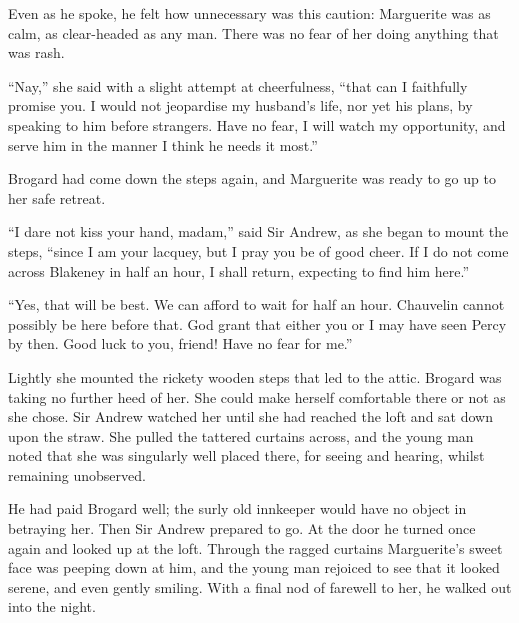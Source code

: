 Even as he spoke, he felt how unnecessary was this caution: Marguerite was as calm, as clear-headed as any man. There was no fear of her doing anything that was rash.

\enquote{Nay,} she said with a slight attempt at cheerfulness, \enquote{that can I faithfully promise you. I would not jeopardise my husband's life, nor yet his plans, by speaking to him before strangers. Have no fear, I will watch my opportunity, and serve him in the manner I think he needs it most.}

Brogard had come down the steps again, and Marguerite was ready to go up to her safe retreat.

\enquote{I dare not kiss your hand, madam,} said Sir Andrew, as she began to mount the steps, \enquote{since I am your lacquey, but I pray you be of good cheer. If I do not come across Blakeney in half an hour, I shall return, expecting to find him here.}

\enquote{Yes, that will be best. We can afford to wait for half an hour. Chauvelin cannot possibly be here before that. God grant that either you or I may have seen Percy by then. Good luck to you, friend! Have no fear for me.}

Lightly she mounted the rickety wooden steps that led to the attic. Brogard was taking no further heed of her. She could make herself comfortable there or not as she chose. Sir Andrew watched her until she had reached the loft and sat down upon the straw. She pulled the tattered curtains across, and the young man noted that she was singularly well placed there, for seeing and hearing, whilst remaining unobserved.

He had paid Brogard well; the surly old innkeeper would have no object in betraying her. Then Sir Andrew prepared to go. At the door he turned once again and looked up at the loft. Through the ragged curtains Marguerite's sweet face was peeping down at him, and the young man rejoiced to see that it looked serene, and even gently smiling. With a final nod of farewell to her, he walked out into the night.